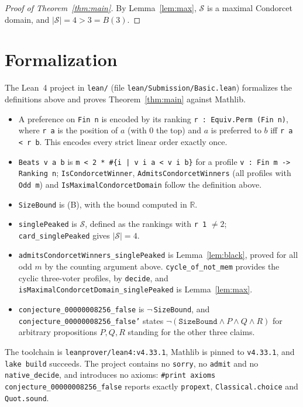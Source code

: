 \documentclass[11pt]{article}
\theoremstyle{plain}
\theoremstyle{definition}
\theoremstyle{remark}
\newcommand{\SP}{\mathcal S}
\begin{document}
\begin{proof}[Proof of Theorem~\ref{thm:main}]
By Lemma~\ref{lem:max}, $\SP$ is a maximal Condorcet domain, and $|\SP|=4>3=B(3)$.
\end{proof}

\section{Formalization}

The Lean~4 project in \texttt{lean/} (file \texttt{lean/Submission/Basic.lean})
formalizes the definitions above and proves Theorem~\ref{thm:main} against Mathlib.
\begin{itemize}
  \item A preference on \texttt{Fin n} is encoded by its ranking
    \texttt{r : Equiv.Perm (Fin n)}, where \texttt{r a} is the position of $a$
    (with $0$ the top) and $a$ is preferred to $b$ iff \texttt{r a < r b}. This
    encodes every strict linear order exactly once.
  \item \texttt{Beats v a b} is \texttt{m < 2 * \#\{i | v i a < v i b\}} for a
    profile \texttt{v : Fin m -> Ranking n}; \texttt{IsCondorcetWinner},
    \texttt{AdmitsCondorcetWinners} (all profiles with \texttt{Odd m}) and
    \texttt{IsMaximalCondorcetDomain} follow the definition above.
  \item \texttt{SizeBound} is (B), with the bound computed in $\mathbb R$.
  \item \texttt{singlePeaked} is $\SP$, defined as the rankings with
    \texttt{r 1} $\ne 2$; \texttt{card\_singlePeaked} gives $|\SP|=4$.
  \item \texttt{admitsCondorcetWinners\_singlePeaked} is Lemma~\ref{lem:black},
    proved for all odd $m$ by the counting argument above.
    \texttt{cycle\_of\_not\_mem} provides the cyclic three-voter profiles, by
    \texttt{decide}, and \texttt{isMaximalCondorcetDomain\_singlePeaked} is
    Lemma~\ref{lem:max}.
  \item \texttt{conjecture\_00000008256\_false} is $\lnot\,$\texttt{SizeBound}, and
    \texttt{conjecture\_00000008256\_false'} states
    $\lnot(\texttt{SizeBound}\wedge P\wedge Q\wedge R)$ for arbitrary propositions
    $P,Q,R$ standing for the other three claims.
\end{itemize}
The toolchain is \texttt{leanprover/lean4:v4.33.1}, Mathlib is pinned to
\texttt{v4.33.1}, and \texttt{lake build} succeeds. The project contains no
\texttt{sorry}, no \texttt{admit} and no \texttt{native\_decide}, and introduces no
axioms: \texttt{\#print axioms conjecture\_00000008256\_false} reports exactly
\texttt{propext}, \texttt{Classical.choice} and \texttt{Quot.sound}.
\end{document}
